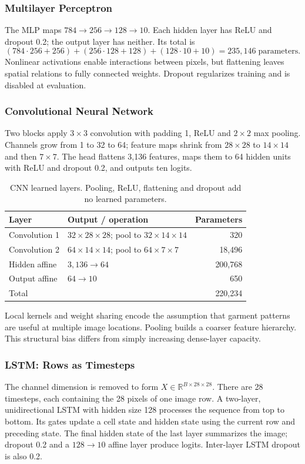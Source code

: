 \subsubsection{Multilayer Perceptron}
The MLP maps $784\to256\to128\to10$. Each hidden layer has ReLU and dropout 0.2; the output layer has neither. Its total is
\begin{equation}
(784\cdot256+256)+(256\cdot128+128)+(128\cdot10+10)=235{,}146\;\text{parameters}.
\end{equation}
Nonlinear activations enable interactions between pixels, but flattening leaves spatial relations to fully connected weights. Dropout regularizes training and is disabled at evaluation.

\subsubsection{Convolutional Neural Network}
Two blocks apply $3\times3$ convolution with padding 1, ReLU and $2\times2$ max pooling. Channels grow from 1 to 32 to 64; feature maps shrink from $28\times28$ to $14\times14$ and then $7\times7$. The head flattens 3,136 features, maps them to 64 hidden units with ReLU and dropout 0.2, and outputs ten logits.
\begin{table}[!htbp]\centering\small
\caption{CNN learned layers. Pooling, ReLU, flattening and dropout add no learned parameters.}
\begin{tabularx}{\linewidth}{@{}lXr@{}}\toprule
Layer & Output / operation & Parameters\\\midrule
Convolution 1 & $32\times28\times28$; pool to $32\times14\times14$ & 320\\
Convolution 2 & $64\times14\times14$; pool to $64\times7\times7$ & 18,496\\
Hidden affine & $3{,}136\to64$ & 200,768\\
Output affine & $64\to10$ & 650\\\midrule
Total & & 220,234\\\bottomrule\end{tabularx}\end{table}
Local kernels and weight sharing encode the assumption that garment patterns are useful at multiple image locations. Pooling builds a coarser feature hierarchy. This structural bias differs from simply increasing dense-layer capacity.

\subsubsection{LSTM: Rows as Timesteps}
The channel dimension is removed to form $X\in\mathbb R^{B\times28\times28}$. There are 28 timesteps, each containing the 28 pixels of one image row. A two-layer, unidirectional LSTM with hidden size 128 processes the sequence from top to bottom. Its gates update a cell state and hidden state using the current row and preceding state. The final hidden state of the last layer summarizes the image; dropout 0.2 and a $128\to10$ affine layer produce logits. Inter-layer LSTM dropout is also 0.2.

